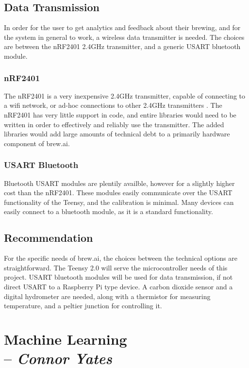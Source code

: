 \documentclass[draftclsnofoot,onecolumn,letterpaper,10pt]{IEEEtran}
\begin{document}
\subsection{Data Transmission}
In order for the user to get analytics and feedback about their brewing, and for the system in general to work, a wireless data transmitter is needed.
The choices are between the nRF2401 2.4GHz transmitter, and a generic USART bluetooth module.
\subsubsection{nRF2401}
The nRF2401 is a very inexpensive 2.4GHz transmitter, capable of connecting to a wifi network, or ad-hoc connections to other 2.4GHz 
	transmitters \cite{nrf}.
The nRF2401 has very little support in code, and entire libraries would need to be written in order to effectively and reliably use the transmitter.
The added libraries would add large amounts of technical debt to a primarily hardware component of brew.ai.
\subsubsection{USART Bluetooth}
Bluetooth USART modules are plentily availble, however for a slightly higher cost than the nRF2401.
These modules easily communicate over the USART functionality of the Teensy, and the calibration is minimal.
Many devices can easily connect to a bluetooth module, as it is a standard functionality.

\subsection{Recommendation}
For the specific needs of brew.ai, the choices between the technical options are straightforward.
The Teensy 2.0 will serve the microcontroller needs of this project.
USART bluetooth modules will be used for data transmission, if not direct USART to a Raspberry Pi type device.
A carbon dioxide sensor and a digital hydrometer are needed, along with a thermistor for measuring temperature, and a peltier junction for controlling it.

\section{Machine Learning \\ -- \textbf{\textit{Connor Yates}}}
\end{document}
